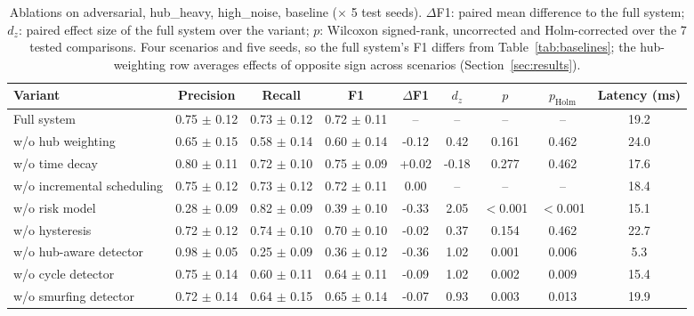 \begin{table}[t]
\centering
\caption{Ablations on adversarial, hub\_heavy, high\_noise, baseline
($\times$ 5 test seeds). $\Delta$F1: paired mean difference to the full system;
$d_z$: paired effect size of the full system over the variant; $p$: Wilcoxon signed-rank,
uncorrected and Holm-corrected over the 7 tested comparisons. Four scenarios and five seeds,
so the full system's F1 differs from Table~\ref{tab:baselines}; the hub-weighting row averages
effects of opposite sign across scenarios (Section~\ref{sec:results}).}
\label{tab:ablation}
\begin{tabular}{lcccccccc}
\toprule
Variant & Precision & Recall & F1 & $\Delta$F1 & $d_z$ & $p$ & $p_{\mathrm{Holm}}$ & Latency (ms) \\
\midrule
Full system & 0.75 $\pm$ 0.12 & 0.73 $\pm$ 0.12 & 0.72 $\pm$ 0.11 & -- & -- & -- & -- & 19.2 \\
w/o hub weighting & 0.65 $\pm$ 0.15 & 0.58 $\pm$ 0.14 & 0.60 $\pm$ 0.14 & -0.12 & 0.42 & 0.161 & 0.462 & 24.0 \\
w/o time decay & 0.80 $\pm$ 0.11 & 0.72 $\pm$ 0.10 & 0.75 $\pm$ 0.09 & +0.02 & -0.18 & 0.277 & 0.462 & 17.6 \\
w/o incremental scheduling & 0.75 $\pm$ 0.12 & 0.73 $\pm$ 0.12 & 0.72 $\pm$ 0.11 & 0.00 & -- & -- & -- & 18.4 \\
w/o risk model & 0.28 $\pm$ 0.09 & 0.82 $\pm$ 0.09 & 0.39 $\pm$ 0.10 & -0.33 & 2.05 & $<$0.001 & $<$0.001 & 15.1 \\
w/o hysteresis & 0.72 $\pm$ 0.12 & 0.74 $\pm$ 0.10 & 0.70 $\pm$ 0.10 & -0.02 & 0.37 & 0.154 & 0.462 & 22.7 \\
w/o hub-aware detector & 0.98 $\pm$ 0.05 & 0.25 $\pm$ 0.09 & 0.36 $\pm$ 0.12 & -0.36 & 1.02 & 0.001 & 0.006 & 5.3 \\
w/o cycle detector & 0.75 $\pm$ 0.14 & 0.60 $\pm$ 0.11 & 0.64 $\pm$ 0.11 & -0.09 & 1.02 & 0.002 & 0.009 & 15.4 \\
w/o smurfing detector & 0.72 $\pm$ 0.14 & 0.64 $\pm$ 0.15 & 0.65 $\pm$ 0.14 & -0.07 & 0.93 & 0.003 & 0.013 & 19.9 \\
\bottomrule
\end{tabular}
\end{table}
